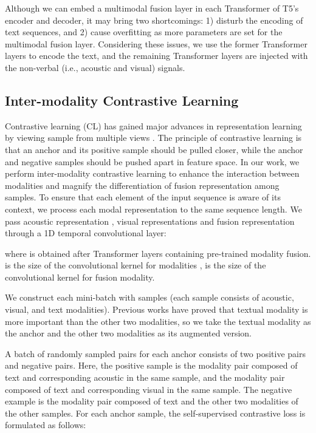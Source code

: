 \documentclass[11pt]{article}
\begin{document}
Although we can embed a multimodal fusion layer in each Transformer of T5's encoder and decoder, it may bring two shortcomings: 1) disturb the encoding of text sequences, and 2) cause overfitting as more parameters are set for the multimodal fusion layer. Considering these issues, we use the former  Transformer layers to encode the text, and the remaining Transformer layers are injected with the non-verbal (i.e., acoustic and visual) signals.





\subsection{Inter-modality Contrastive Learning}
Contrastive learning (CL) has gained major advances in representation learning by viewing sample from multiple views \cite{DBLP:journals/jmlr/GutmannH10,DBLP:conf/nips/KhoslaTWSTIMLK20,DBLP:conf/emnlp/GaoYC21}. The principle of contrastive learning is that an anchor and its positive sample should be pulled closer, while the anchor and negative samples should be pushed apart in feature space. In our work, we perform inter-modality contrastive learning to enhance the interaction between modalities and magnify the differentiation of fusion representation among samples.
To ensure that each element of the input sequence is aware of its context, we process each modal representation to the same sequence length. We pass acoustic representation , visual representations  and fusion representation  through a 1D temporal convolutional layer:

where  is obtained after  Transformer layers containing pre-trained modality fusion.  is the size of the convolutional kernel for modalities ,  is the size of the convolutional kernel for fusion modality.


We construct each mini-batch with  samples (each sample consists of acoustic, visual, and text modalities). Previous works \cite{DBLP:conf/emnlp/HanCP21,DBLP:conf/acl/TsaiBLKMS19} have proved that textual modality is more important than the other two modalities, so we take the textual modality as the anchor and the other two modalities as its augmented version.

A batch of randomly sampled pairs for each anchor consists of two positive pairs and  negative pairs. Here, the positive sample is the modality pair composed of text and corresponding acoustic in the same sample, and the modality pair composed of text and corresponding visual in the same sample. The negative example is the modality pair composed of text and the other two modalities of the other samples. For each anchor sample, the self-supervised contrastive loss is formulated as follows:
\end{document}
